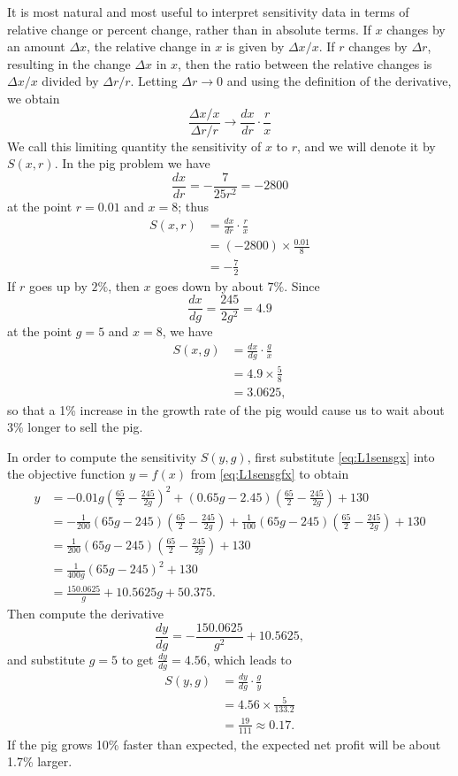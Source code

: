 It is most natural and most useful to interpret sensitivity data in terms of relative change or percent change, rather than in absolute terms. If $x$ changes by an amount $\Delta x$, the relative change in $x$ is given by $\Delta x/x$. If $r$ changes
by $\Delta r$, resulting in the change $\Delta x$ in $x$, then the ratio between the relative changes is $\Delta x/x$ divided by $\Delta r/r$. Letting $\Delta r\to0$ and using the definition of the derivative, we obtain
$$
\frac{\Delta x/x}{\Delta r/r}\to\frac{dx}{dr}\cdot\frac{r}{x}
$$
We call this limiting quantity the sensitivity of $x$ to $r$, and we will denote it by $S(x,r)$. In the pig problem we have
$$
\frac{dx}{dr}=-\frac{7}{25r^2}=-2800
$$
at the point $r=0.01$ and $x=8$; thus
\begin{align*}
S(x,r)&=\frac{dx}{dr}\cdot\frac{r}{x}\\
&=(-2800)\times\frac{0.01}{8}\\
&=-\frac{7}{2}
\end{align*}
If $r$ goes up by $2\%$, then $x$ goes down by about $7\%$. Since
$$
\frac{dx}{dg}=\frac{245}{2g^2}=4.9
$$
at the point $g=5$ and $x=8$, we have
\begin{align*}
S(x,g)&=\frac{dx}{dg}\cdot\frac{g}{x}\\
&=4.9\times\frac{5}{8}\\
&=3.0625,
\end{align*}
so that a 1\% increase in the growth rate of the pig would cause us to wait about 3\% longer to sell the pig.

In order to compute the sensitivity $S(y,g)$, first substitute \eqref{eq:L1sensgx} into the objective function $y=f(x)$ from \eqref{eq:L1sensgfx} to obtain
\begin{align*}
y&=-0.01g\left(\frac{65}{2}-\frac{245}{2g}\right)^2+(0.65g-2.45)\left(\frac{65}{2}-\frac{245}{2g}\right)+130\\
&=-\frac{1}{200}(65g-245)\left(\frac{65}{2}-\frac{245}{2g}\right)+\frac{1}{100}(65g-245)\left(\frac{65}{2}-\frac{245}{2g}\right)+130\\
&=\frac{1}{200}(65g-245)\left(\frac{65}{2}-\frac{245}{2g}\right)+130\\
&=\frac{1}{400g}(65g-245)^2+130\\
&=\frac{150.0625}{g}+10.5625g+50.375.
\end{align*}
Then compute the derivative
$$
\frac{dy}{dg}=-\frac{150.0625}{g^2}+10.5625,
$$
and substitute $g=5$ to get $\frac{dy}{dg}=4.56$, which leads to
\begin{align*}
S(y,g)&=\frac{dy}{dg}\cdot\frac{g}{y}\\
&=4.56\times\frac{5}{133.2}\\
&=\frac{19}{111}\approx0.17.
\end{align*}
If the pig grows 10\% faster than expected, the expected net profit will be about 1.7\% larger.

